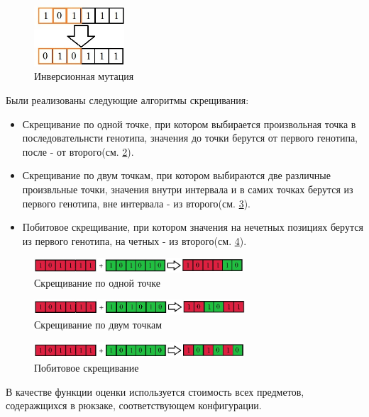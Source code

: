 	\begin{figure}[htbp]
	\includegraphics[width=0.3\textwidth]{./Pics/2.jpg}
		\caption{Инверсионная мутация}
	\label{mutation2}
	\end{figure}	
\FloatBarrier
 Были реализованы следующие алгоритмы скрещивания:
 \begin{itemize}
	\item Скрещивание по одной точке, при котором выбирается произвольная точка в последовательнсти генотипа, значения до точки берутся от первого генотипа, после - от второго(см. \ref{crossing1}). 
	\item Скрещивание по двум точкам, при котором выбираются две различные произвльные точки, значения внутри интервала и в самих точках берутся из первого генотипа, вне интервала - из второго(см. \ref{crossing2}). 
	\item Побитовое скрещивание, при котором значения на нечетных позициях берутся из первого генотипа, на четных - из второго(см. \ref{crossing3}).  
 \end{itemize}
\FloatBarrier
	\begin{figure}[htbp]
	\includegraphics[width=0.7\textwidth]{./Pics/3.jpg}
	\caption{Скрещивание по одной точке}
	\label{crossing1}
\end{figure}

	\begin{figure}[htbp]
	\includegraphics[width=0.7\textwidth]{./Pics/4.jpg}
	\caption{Скрещивание по двум точкам}
	\label{crossing2}
\end{figure}

	\begin{figure}[htbp]
	\includegraphics[width=0.7\textwidth]{./Pics/5.jpg}
	\caption{Побитовое скрещивание}
	\label{crossing3}
\end{figure}
\FloatBarrier
 В качестве функции оценки используется стоимость всех предметов, содеражщихся в рюкзаке, соответствующем конфигурации.
 
